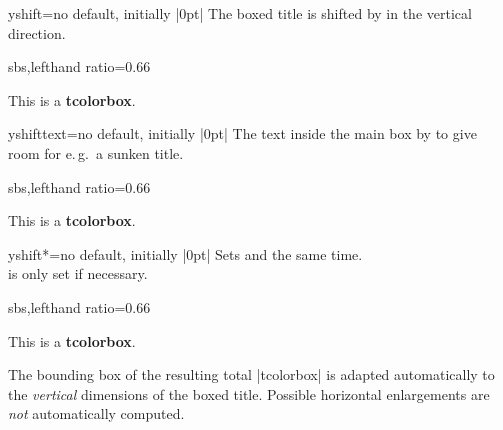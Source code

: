 \begin{boxTcbKey}{yshift}{=}{no default, initially |0pt|}
The boxed title is shifted by  in the vertical direction.
\begin{dispExample*}{sbs,lefthand ratio=0.66}
\begin{tcolorbox}[enhanced,title=My title,
  attach boxed title to top center=
    {yshift=-\tcboxedtitleheight/2},
  boxed title style={size=small,colback=blue}]
  This is a \textbf{tcolorbox}.
\end{tcolorbox}
\end{dispExample*}
\end{boxTcbKey}

\begin{boxTcbKey}{yshifttext}{=}{no default, initially |0pt|}
The text inside the main box by  to give room for e.\,g.\ a sunken title.
\begin{dispExample*}{sbs,lefthand ratio=0.66}
\begin{tcolorbox}[enhanced,title=My title,
  attach boxed title to top center=
    {yshift=-3mm,yshifttext=-1mm},
  boxed title style={size=small,colback=blue}]
  This is a \textbf{tcolorbox}.
\end{tcolorbox}
\end{dispExample*}
\end{boxTcbKey}

\begin{boxTcbKey}{yshift*}{=}{no default, initially |0pt|}
Sets  and 
the same time.\\
 is only set if necessary.
\begin{dispExample*}{sbs,lefthand ratio=0.66}
\begin{tcolorbox}[enhanced,title=My title,
  attach boxed title to top center={yshift*=-3mm},
  boxed title style={size=small,colback=blue}]
  This is a \textbf{tcolorbox}.
\end{tcolorbox}
\end{dispExample*}
\end{boxTcbKey}

\begin{marker}
The bounding box of the resulting total |tcolorbox| is adapted automatically to the
\emph{vertical} dimensions of the boxed title. Possible horizontal enlargements
are \emph{not} automatically computed.
\end{marker}


